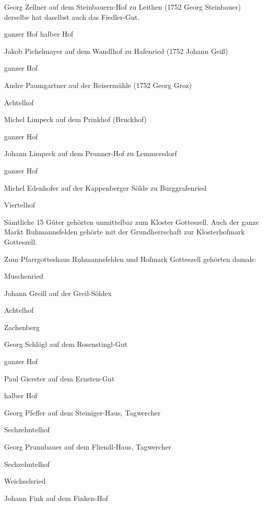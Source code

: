 \documentclass{book}
\begin{document}
Georg Zellner auf dem Steinbauern-Hof zu Leithen (1752 Georg Steinbauer)
derselbe hat daselbst auch das Fiedler-Gut.

ganzer Hof halber Hof



Jakob Pichelmayer auf dem Wandlhof zu Hafenried (1752 Johann Geiß)

ganzer Hof



Andre Paumgartner auf der Reisermühle (1752 Georg Groz)

Achtelhof



Michel Limpeck auf dem Prinkhof (Bruckhof)

ganzer Hof



Johann Limpeck auf dem Prunner-Hof zu Lemmersdorf

ganzer Hof



Michel Edenhofer auf der Kappenberger Sölde zu Burggrafenried

Viertelhof



Sämtliche 15 Güter gehörten unmittelbar zum Kloster Gotteszell. Auch der ganze
Markt Ruhmannsfelden gehörte mit der Grundherrschaft zur Klosterhofmark
Gotteszell.



Zum Pfarrgotteshaus Ruhmannsfelden und Hofmark Gotteszell gehörten damals:



Muschenried

Johann Greill auf der Greil-Söldex

Achtelhof

Zachenberg

Georg Schlögl auf dem Rosenstingl-Gut

ganzer Hof



Paul Gierster auf dem Ernsten-Gut

halber Hof



Georg Pfeffer auf dem Steiniger-Haus, Tagwercher

Sechzehntelhof



Georg Prunnbauer auf dem Fliendl-Haus, Tagwercher

Sechzehntelhof

Weichselsried

Johann Fink auf dem Finken-Hof
\end{document}
